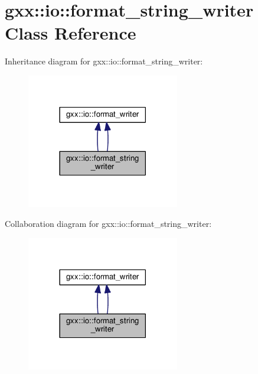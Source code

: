 \hypertarget{classgxx_1_1io_1_1format__string__writer}{}\section{gxx\+:\+:io\+:\+:format\+\_\+string\+\_\+writer Class Reference}
\label{classgxx_1_1io_1_1format__string__writer}


Inheritance diagram for gxx\+:\+:io\+:\+:format\+\_\+string\+\_\+writer\+:
\nopagebreak
\begin{figure}[H]
\begin{center}
\leavevmode
\includegraphics[width=189pt]{classgxx_1_1io_1_1format__string__writer__inherit__graph}
\end{center}
\end{figure}


Collaboration diagram for gxx\+:\+:io\+:\+:format\+\_\+string\+\_\+writer\+:
\nopagebreak
\begin{figure}[H]
\begin{center}
\leavevmode
\includegraphics[width=189pt]{classgxx_1_1io_1_1format__string__writer__coll__graph}
\end{center}
\end{figure}
